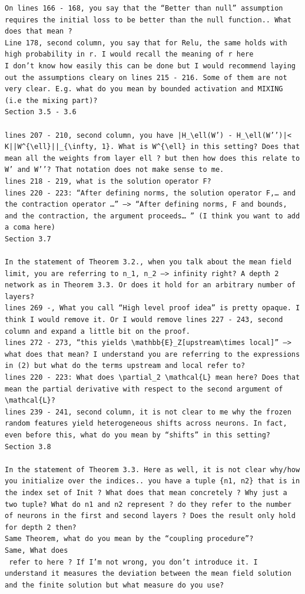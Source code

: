 \documentclass[11pt,a4paper]{article}
\begin{document}
\begin{verbatim}
On lines 166 - 168, you say that the “Better than null” assumption requires the initial loss to be better than the null function.. What does that mean ?
Line 178, second column, you say that for Relu, the same holds with high probability in r. I would recall the meaning of r here
I don’t know how easily this can be done but I would recommend laying out the assumptions cleary on lines 215 - 216. Some of them are not very clear. E.g. what do you mean by bounded activation and MIXING (i.e the mixing part)?
Section 3.5 - 3.6

lines 207 - 210, second column, you have |H_\ell(W’) - H_\ell(W’’)|< K||W^{\ell}||_{\infty, 1}. What is W^{\ell} in this setting? Does that mean all the weights from layer ell ? but then how does this relate to W’ and W’’? That notation does not make sense to me.
lines 218 - 219, what is the solution operator F?
lines 220 - 223: “After defining norms, the solution operator F,… and the contraction operator …” —> “After defining norms, F and bounds, and the contraction, the argument proceeds… ” (I think you want to add a coma here)
Section 3.7

In the statement of Theorem 3.2., when you talk about the mean field limit, you are referring to n_1, n_2 —> infinity right? A depth 2 network as in Theorem 3.3. Or does it hold for an arbitrary number of layers?
lines 269 -, What you call “High level proof idea” is pretty opaque. I think I would remove it. Or I would remove lines 227 - 243, second column and expand a little bit on the proof.
lines 272 - 273, “this yields \mathbb{E}_Z[upstream\times local]” —> what does that mean? I understand you are referring to the expressions in (2) but what do the terms upstream and local refer to?
lines 220 - 223: What does \partial_2 \mathcal{L} mean here? Does that mean the partial derivative with respect to the second argument of \mathcal{L}?
lines 239 - 241, second column, it is not clear to me why the frozen random features yield heterogeneous shifts across neurons. In fact, even before this, what do you mean by “shifts” in this setting?
Section 3.8

In the statement of Theorem 3.3. Here as well, it is not clear why/how you initialize over the indices.. you have a tuple {n1, n2} that is in the index set of Init ? What does that mean concretely ? Why just a two tuple? What do n1 and n2 represent ? do they refer to the number of neurons in the first and second layers ? Does the result only hold for depth 2 then?
Same Theorem, what do you mean by the “coupling procedure”?
Same, What does 
 refer to here ? If I’m not wrong, you don’t introduce it. I understand it measures the deviation between the mean field solution and the finite solution but what measure do you use?
\end{verbatim}
\end{document}
